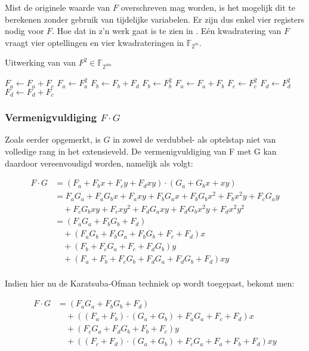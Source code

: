 Mist de originele waarde van $F$ overschreven mag worden, is het mogelijk dit te berekenen zonder gebruik van tijdelijke variabelen. Er zijn dus enkel vier registers nodig voor $F$. Hoe dat in z'n werk gaat is te zien in . E\'en kwadratering van $F$ vraagt vier optellingen en vier kwadrateringen in $\mathbb{F}_{2^m}$.

\begin{algorithm}[h]
	\caption{Uitwerking van van $F^2 \in \mathbb{F}_{2^{4m}}$}
	\label{algoritme-implementatie-miller-f-square}
	$F_a \leftarrow F_a + F_c$\;
	$F_a \leftarrow F_a^2$\;
	$F_b \leftarrow F_b + F_d$\;
	$F_b \leftarrow F_b^2$\;
	$F_a \leftarrow F_a + F_b$\;
	$F_c \leftarrow F_c^2$\;
	$F_d \leftarrow F_d^2$\;
	$F_d \leftarrow F_d + F_c$\;
\end{algorithm}

\subsubsection{Vermenigvuldiging $F \cdot G$}

Zoals eerder opgemerkt, is $G$ in zowel de verdubbel- als optelstap niet van volledige rang in het extensieveld. De vermenigvuldiging van F met G kan daardoor vereenvoudigd worden, namelijk als volgt:

\[\begin{aligned}
F \cdot G	&= (F_a + F_b x + F_c y + F_d xy) \cdot (G_a + G_b x + xy)\\
	&= F_a G_a + F_a G_b x + F_a xy + F_b G_a x + F_b G_b x^2 + F_b x^2y + F_c G_a y\\
		&\quad + F_c G_b xy + F_c xy^2 + F_d G_a xy + F_d G_b x^2y + F_d x^2 y^2\\
	&= (F_a G_a + F_b G_b + F_d)\\
		&\quad + (F_a G_b + F_b G_a + F_b G_b + F_c + F_d)x\\
		&\quad + (F_b + F_c G_a + F_c + F_d G_b)y\\
		&\quad + (F_a + F_b + F_c G_b + F_d G_a + F_d G_b + F_d)xy\\
\end{aligned}\]

Indien hier nu de Karatsuba-Ofman techniek \cite{karatsuba-oldest, zuras} op wordt toegepast, bekomt men:

\[\begin{aligned}
F \cdot G &= (F_a G_a + F_b G_b + F_d)\\
				&\quad + ((F_a + F_b) \cdot (G_a + G_b) + F_a G_a + F_c + F_d)x\\
				&\quad + (F_c G_a + F_d G_b + F_b + F_c)y\\
				&\quad + ((F_c + F_d) \cdot (G_a + G_b) + F_c G_a + F_a + F_b + F_d)xy\\
\end{aligned}\]

